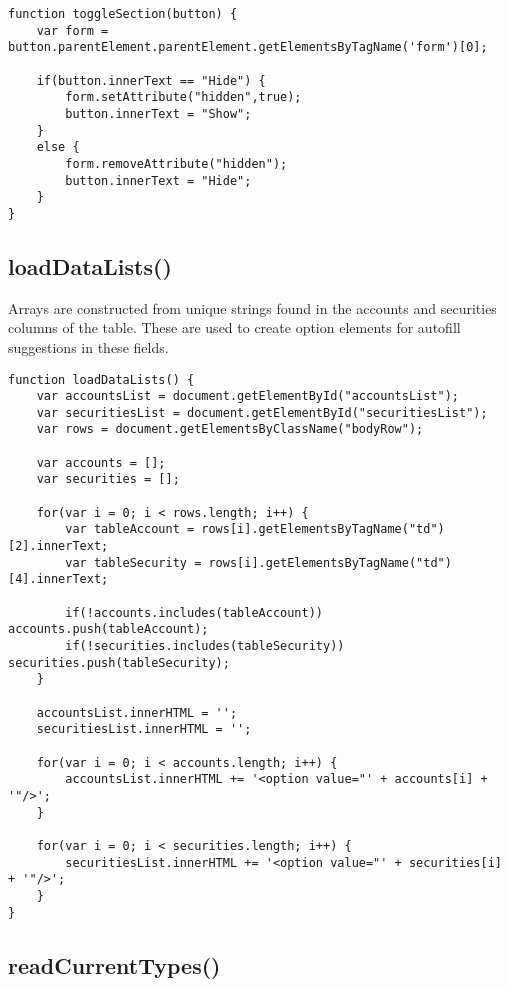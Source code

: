 \documentclass[letterpaper]{article}
\begin{document}
\begin{lstlisting}[firstnumber=693]
function toggleSection(button) {
    var form = button.parentElement.parentElement.getElementsByTagName('form')[0];

    if(button.innerText == "Hide") {
        form.setAttribute("hidden",true);
        button.innerText = "Show";
    }
    else {
        form.removeAttribute("hidden");
        button.innerText = "Hide";
    }
}
\end{lstlisting}

\subsection{loadDataLists()}

Arrays are constructed from unique strings found in the accounts and securities columns of the table.
These are used to create option elements for autofill suggestions in these fields.

\begin{lstlisting}[firstnumber=706]
function loadDataLists() {
    var accountsList = document.getElementById("accountsList");
    var securitiesList = document.getElementById("securitiesList");
    var rows = document.getElementsByClassName("bodyRow");

    var accounts = [];
    var securities = [];

    for(var i = 0; i < rows.length; i++) {
        var tableAccount = rows[i].getElementsByTagName("td")[2].innerText;
        var tableSecurity = rows[i].getElementsByTagName("td")[4].innerText;

        if(!accounts.includes(tableAccount)) accounts.push(tableAccount);
        if(!securities.includes(tableSecurity)) securities.push(tableSecurity);
    }

    accountsList.innerHTML = '';
    securitiesList.innerHTML = '';

    for(var i = 0; i < accounts.length; i++) {
        accountsList.innerHTML += '<option value="' + accounts[i] + '"/>';
    }

    for(var i = 0; i < securities.length; i++) {
        securitiesList.innerHTML += '<option value="' + securities[i] + '"/>';
    }
}
\end{lstlisting}

\subsection{readCurrentTypes()}
\end{document}
